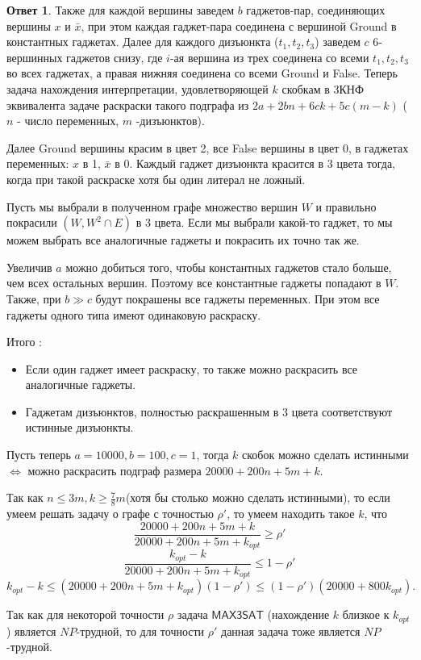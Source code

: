 \documentclass[a4paper]{article}
\theoremstyle{plain}
\theoremstyle{definition}
\newtheorem*{answer}{Ответ}
\begin{document}
\begin{answer}
Также для каждой вершины заведем $b$ гаджетов-пар, соединяющих вершины $x$ и $\bar{x}$, при этом каждая гаджет-пара соединена с вершиной Ground в константных гаджетах. Далее для каждого дизъюнкта ($t_1, t_2, t_3$) заведем $c$ 6-вершинных гаджетов снизу, где $i$-ая вершина из трех соединена со всеми $t_1, t_2, t_3$ во всех гаджетах, а правая нижняя соединена со всеми Ground и False. Теперь задача нахождения интерпретации, удовлетворяющей $k$ скобкам в 3КНФ эквивалента задаче раскраски такого подграфа из $2a + 2bn + 6ck + 5c(m-k)$ ($n$ - число переменных, $m$ -дизъюнктов).
\item Далее Ground вершины красим в цвет 2, все False вершины в цвет 0, в гаджетах переменных: $x$ в 1, $\bar{x}$ в 0. Каждый гаджет дизъюнкта красится в 3 цвета тогда, когда при такой раскраске хотя бы один литерал не ложный.
\item Пусть мы выбрали в полученном графе множество вершин $W$ и правильно покрасили $(W, W^2 \cap E)$ в 3 цвета. Если мы выбрали какой-то гаджет, то мы можем выбрать все аналогичные гаджеты и покрасить их точно так же.
\item Увеличив $a$ можно добиться того, чтобы константных гаджетов стало больше, чем всех остальных вершин. Поэтому все константные гаджеты попадают в $W$. Также, при $b \gg c$ будут покрашены все гаджеты переменных. При этом все гаджеты одного типа имеют одинаковую раскраску.
\item Итого : 
\begin{itemize}
\item Если один гаджет имеет раскраску, то также можно раскрасить все аналогичные гаджеты. 
\item Гаджетам дизъюнктов, полностью раскрашенным в 3 цвета соответствуют истинные дизъюнкты.
\end{itemize}
\item Пусть теперь $a =10000, b = 100, c = 1$, тогда $k$ скобок можно сделать истинными $\Longleftrightarrow$ можно раскрасить подграф размера $20000+ 200n + 5m + k$.
\item Так как $n \leq 3m, k \geq \frac{7}{8}m$(хотя бы столько можно сделать истинными), то если умеем решать задачу о графе с точностью $\rho'$, то умеем находить такое $k$, что 
\begin{equation} 
  \frac{20000+ 200n + 5m +k}{20000+ 200n + 5m +k_{opt}} \geq \rho'
\end{equation}
\begin{equation} 
  \frac{k_{opt} - k}{20000+ 200n + 5m +k_{opt}} \leq 1 - \rho'
\end{equation}
\begin{equation} 
  k_{opt} - k \leq (20000+ 200n + 5m +k_{opt})(1 - \rho') \leq (1 - \rho')(20000 + 800k_{opt}).
\end{equation}
\item Так как для некоторой точности $\rho$ задача $\textsf{MAX3SAT}$ (нахождение $k$ близкое к $k_{opt}$) является $NP$-трудной, то для точности $\rho'$ данная задача тоже является $NP$-трудной.
\end{answer}
\end{document}
